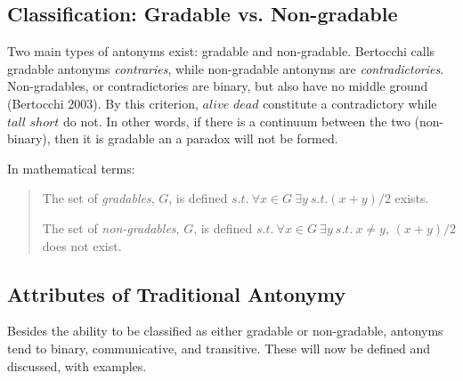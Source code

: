
\subsection {Classification: Gradable vs. Non-gradable}
\label{classification}
Two main types of antonyms exist: gradable and non-gradable. Bertocchi calls gradable antonyms \textit{contraries}, while non-gradable antonyms are \textit{contradictories}.   Non-gradables, or contradictories are binary, but also have no middle ground (Bertocchi 2003).  By this criterion, $alive$ \opp $dead$ constitute a contradictory while $tall$ \opp $short$ do not.  In other words, if there is a continuum between the two (non-binary), then it is gradable an a paradox will not be formed. 

In mathematical terms: 
	\begin{quote}
		The set of \textit{gradables}, $G$, is defined $s.t.~ \forall x \in G~\exists y~s.t. (x+y)/2$ exists.

		The set of \textit{non-gradables}, $G$, is defined $s.t.~ \forall x \in G~\exists y~s.t.~x\not=y$, $(x+y)/2$ does not exist.
	\end{quote}


\subsection {Attributes of Traditional Antonymy} 
Besides the ability to be classified as either gradable or non-gradable, antonyms tend to binary, communicative, and transitive. These will now be defined and discussed, with examples.  

